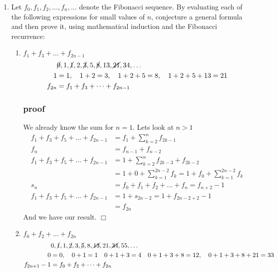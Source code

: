 \documentclass{article}
\begin{document}
\begin{enumerate}
\item
Let $f_0,f_1,f_2,\dots,f_n,\dots$ denote the Fibonacci sequence. By evaluating each of the following expressions for small values of $n$, conjecture a general formula and then prove it, using mathematical induction and the Fibonacci recurrence:
\begin{enumerate}
\item
$f_1+f_3+\dots+f_{2n-1}$
\begin{align*}
  &\cancel{0},1,\cancel{1},2,\cancel{3},5,\cancel{8},13,\cancel{21},34,\dots\\
  1&=1,\quad 1+2=3,\quad 1+2+5=8,\quad 1+2+5+13=21\\
  f_{2n}&=f_1+f_3+\dots+f_{2n-1}
\end{align*}
\subsubsection*{proof}
We already know the sum for $n=1$. Lets look at $n>1$
\begin{align*}
  f_1+f_3+f_5+\dots+f_{2n-1}&=f_1+\sum\limits_{k=2}^{n}{f_{2k-1}}\\
  f_n&=f_{n-1}+f_{n-2}\\
  f_1+f_3+f_5+\dots+f_{2n-1}&=1+\sum\limits_{k=2}^{n}{f_{2k-3}+f_{2k-2}}\\
  &=1+0+\sum\limits_{k=1}^{2n-2}{f_{k}}=1+f_0+\sum\limits_{k=1}^{2n-2}{f_{k}}\\
  s_n&=f_0+f_1+f_2+\dots+f_n=f_{n+2}-1\\
  f_1+f_3+f_5+\dots+f_{2n-1}&=1+s_{2n-2}=1+f_{2n-2+2}-1\\
  &=f_{2n}
\end{align*}
And we have our result. $\Box$
\item
$f_0+f_2+\dots+f_{2n}$
\begin{align*}
  &0,\cancel{1},1,\cancel{2},3,\cancel{5},8,\cancel{13},21,\cancel{34},55,\dots\\
  0&=0,\quad0+1=1\quad0+1+3=4\quad0+1+3+8=12,\quad0+1+3+8+21=33\\
  f_{2n+1}-1&=f_0+f_2+\dots+f_{2n}
\end{align*}

\end{enumerate}
\end{enumerate}
\end{document}
